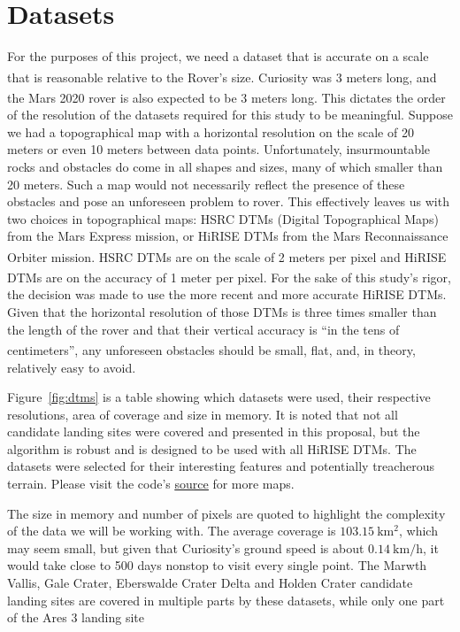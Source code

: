 \documentclass[12pt]{article}
\newcommand{\supcite}[1]{\textsuperscript{\cite{#1}}}
\begin{document}
\section{Datasets}
\label{sec:datasets}
\par For the purposes of this project, we need a dataset that is accurate on a scale that is reasonable relative to the Rover's size. Curiosity was 3 meters long\supcite{bib:curiosity}, and the Mars 2020 rover is also expected to be 3 meters long\supcite{bib:rover2020}. This dictates the order of the resolution of the datasets required for this study to be meaningful. Suppose we had a topographical map with a horizontal resolution on the scale of 20 meters or even 10 meters between data points. Unfortunately, insurmountable rocks and obstacles do come in all shapes and sizes, many of which smaller than 20 meters. Such a map would not necessarily reflect the presence of these obstacles and pose an unforeseen problem to rover. This effectively leaves us with two choices in topographical maps: HSRC DTMs (Digital Topographical Maps) from the Mars Express mission, or HiRISE DTMs from the Mars Reconnaissance Orbiter mission. HSRC DTMs are on the scale of 2 meters per pixel\supcite{bib:hsrc} and HiRISE DTMs are on the accuracy of 1 meter per pixel\supcite{bib:abouthirise}. For the sake of this study's rigor, the decision was made to use the more recent and more accurate HiRISE DTMs. Given that the horizontal resolution of those DTMs is three times smaller than the length of the rover and that their vertical accuracy is ``in the tens of centimeters''\supcite{bib:abouthirise}, any unforeseen obstacles should be small, flat, and, in theory, relatively easy to avoid.
\par Figure~\ref{fig:dtms} is a table showing which datasets were used, their respective resolutions, area of coverage and size in memory. It is noted that not all candidate landing sites were covered and presented in this proposal, but the algorithm is robust and is designed to be used with all HiRISE DTMs. The datasets were selected for their interesting features and potentially treacherous terrain. Please visit the code's \href{https://github.com/PapaCharlie/Rover-Climb-Angles/tree/master/figures/maps/}{\ttfamily\color{blue} \underline{source}} for more maps.
\par The size in memory and number of pixels are quoted to highlight the complexity of the data we will be working with. The average coverage is $\SI{103.15}{\kilo\meter\squared}$, which may seem small, but given that Curiosity's ground speed is about $\SI{0.14}{\kilo\meter\per\hour}$, it would take close to 500 days nonstop to visit every single point. The Marwth Vallis, Gale Crater, Eberswalde Crater Delta and Holden Crater candidate landing sites are covered in multiple parts by these datasets, while only one part of the Ares 3 landing site
\end{document}
